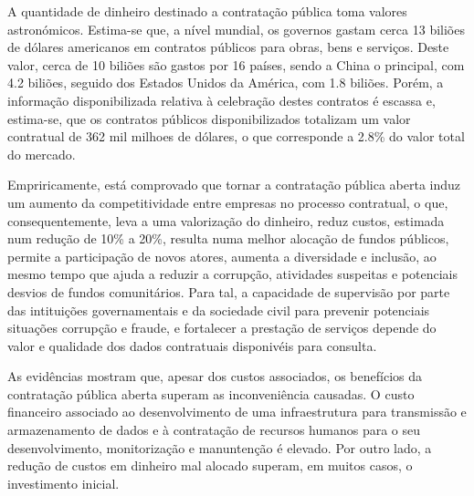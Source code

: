 A quantidade de dinheiro destinado a contratação pública toma valores astronómicos. Estima-se que, a nível mundial, os governos gastam cerca 13 biliões de dólares americanos em contratos públicos para obras, bens e serviços. Deste valor, cerca de 10 biliões são gastos por 16 países, sendo a China o principal, com 4.2 biliões, seguido dos Estados Unidos da América, com 1.8 biliões. Porém, a informação disponibilizada relativa à celebração destes contratos é escassa e, estima-se, que os contratos públicos disponibilizados totalizam um valor contratual de 362 mil milhoes de dólares, o que corresponde a 2.8\% do valor total do mercado\cite{redflags_guide}\cite{govspent}\cite{stateogp}. 

Empriricamente, está comprovado que tornar a contratação pública aberta induz um aumento da competitividade entre empresas no processo contratual, o que, consequentemente, leva a uma valorização do dinheiro, reduz custos, estimada num redução de 10\% a 20\%, resulta numa melhor alocação de fundos públicos, permite a participação de novos atores, aumenta a diversidade e inclusão, ao mesmo tempo que ajuda a reduzir a corrupção, atividades suspeitas e potenciais desvios de fundos comunitários\cite{govspent}\cite{stateogp}. Para tal, a capacidade de supervisão por parte das intituições governamentais e da sociedade civil para prevenir potenciais situações corrupção e fraude, e fortalecer a prestação de serviços depende do valor e qualidade dos dados contratuais disponivéis para consulta.

As evidências mostram que, apesar dos custos associados, os benefícios da contratação pública aberta superam as  inconveniência causadas. O custo financeiro associado ao desenvolvimento de uma infraestrutura para transmissão e armazenamento de dados e à contratação de recursos humanos para o seu desenvolvimento, monitorização e manuntenção é elevado. Por outro lado, a redução de custos em dinheiro mal alocado superam, em muitos casos, o investimento inicial\cite{stateogp}.


